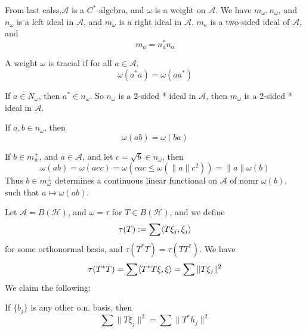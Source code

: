 From last calss,$\mathcal{A}$ is a $C^*$-algebra, and $\omega$ is a weight on $\mathcal{A}$. We have $m_\omega, n_\omega$, and $n_\omega$ is a left ideal in $\mathcal{A}$, and $m_\omega$ is a right ideal in $\mathcal{A}$. $m_a$ is a two-sided ideal of $\mathcal{A}$, and 
\begin{equation*}
    m_a=n_a^*n_a
\end{equation*}
\begin{definition}
    A weight $\omega$ is tracial if for all $a\in\mathcal{A}$,
    \begin{equation*}
        \omega(a^*a)=\omega(aa^*)
    \end{equation*}
\end{definition}
\begin{proposition}
    If $a\in N_\omega$, then $a^*\in n_\omega$. So $n_\omega$ is a 2-sided * ideal in $\mathcal{A}$, then $m_\omega$ is a 2-sided * ideal in $\mathcal{A}$.

    If $a,b\in n_\omega$, then 
    \begin{equation*}
        \omega(ab)=\omega(ba)
    \end{equation*}
\end{proposition}

\begin{proposition}
    If $b\in m_w^+$, and $a\in\mathcal{A}$, and let $c=\sqrt{b}\in n_\omega$, then 
    \begin{equation*}
        \omega(ab)=\omega( acc)=\omega(cac\leq\omega(\|a\|c^2))=\|a\|\omega(b)
    \end{equation*}
    Thus $b\in m_\omega^\perp$ determines a continuous linear functional on $\mathcal{A}$ of nomr $\omega(b)$, such that $a\mapsto \omega(ab)$.
\end{proposition}

Let $\mathcal{A}=B(\mathcal{H})$, and $\omega=\tau$ for $T\in B(\mathcal{H})$, and we define
\begin{equation*}
    \tau(T):=\sum\langle T\xi_j, \xi_j\rangle
\end{equation*}
for some orthonormal basis, and $\tau(T^*T)=\tau(TT^*)$. We have 
\begin{equation*}
    \tau(T^*T)=\sum\langle T^*T\xi, \xi\rangle=\sum\|T\xi_j\|^2
\end{equation*}
We claim the following:
\begin{lemma}
    If $\{b_j\}$ is any other o.n. basis, then 
    \begin{equation*}
        \sum\|T\xi_j\|^2=\sum\|T^*h_j\|^2
    \end{equation*}
\end{lemma}

